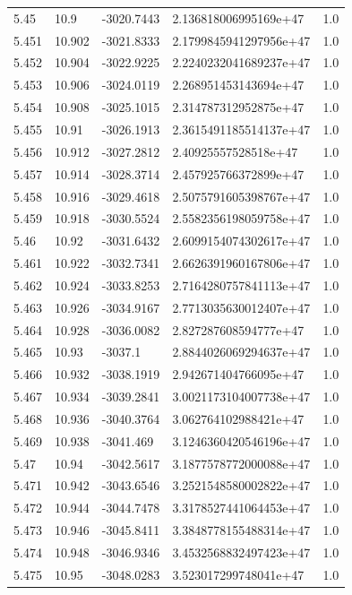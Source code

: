 \begin{tabular}{lllll}
5.45 & 10.9 & -3020.7443 & 2.136818006995169e+47 & 1.0 \\
5.451 & 10.902 & -3021.8333 & 2.1799845941297956e+47 & 1.0 \\
5.452 & 10.904 & -3022.9225 & 2.2240232041689237e+47 & 1.0 \\
5.453 & 10.906 & -3024.0119 & 2.268951453143694e+47 & 1.0 \\
5.454 & 10.908 & -3025.1015 & 2.314787312952875e+47 & 1.0 \\
5.455 & 10.91 & -3026.1913 & 2.3615491185514137e+47 & 1.0 \\
5.456 & 10.912 & -3027.2812 & 2.40925557528518e+47 & 1.0 \\
5.457 & 10.914 & -3028.3714 & 2.457925766372899e+47 & 1.0 \\
5.458 & 10.916 & -3029.4618 & 2.5075791605398767e+47 & 1.0 \\
5.459 & 10.918 & -3030.5524 & 2.5582356198059758e+47 & 1.0 \\
5.46 & 10.92 & -3031.6432 & 2.6099154074302617e+47 & 1.0 \\
5.461 & 10.922 & -3032.7341 & 2.6626391960167806e+47 & 1.0 \\
5.462 & 10.924 & -3033.8253 & 2.7164280757841113e+47 & 1.0 \\
5.463 & 10.926 & -3034.9167 & 2.7713035630012407e+47 & 1.0 \\
5.464 & 10.928 & -3036.0082 & 2.827287608594777e+47 & 1.0 \\
5.465 & 10.93 & -3037.1 & 2.8844026069294637e+47 & 1.0 \\
5.466 & 10.932 & -3038.1919 & 2.942671404766095e+47 & 1.0 \\
5.467 & 10.934 & -3039.2841 & 3.0021173104007738e+47 & 1.0 \\
5.468 & 10.936 & -3040.3764 & 3.062764102988421e+47 & 1.0 \\
5.469 & 10.938 & -3041.469 & 3.1246360420546196e+47 & 1.0 \\
5.47 & 10.94 & -3042.5617 & 3.1877578772000088e+47 & 1.0 \\
5.471 & 10.942 & -3043.6546 & 3.2521548580002822e+47 & 1.0 \\
5.472 & 10.944 & -3044.7478 & 3.3178527441064453e+47 & 1.0 \\
5.473 & 10.946 & -3045.8411 & 3.3848778155488314e+47 & 1.0 \\
5.474 & 10.948 & -3046.9346 & 3.4532568832497423e+47 & 1.0 \\
5.475 & 10.95 & -3048.0283 & 3.523017299748041e+47 & 1.0 \\

\end{tabular}
